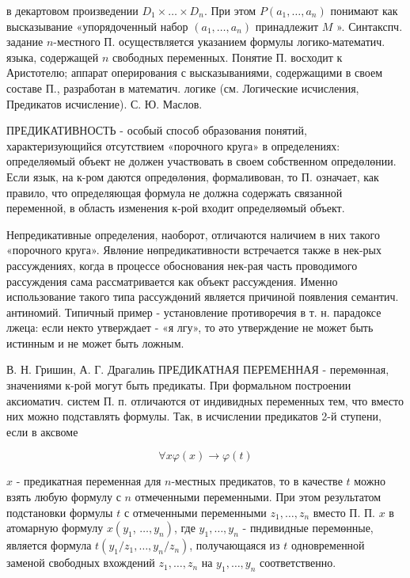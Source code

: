 \documentclass[10pt]{article}
\begin{document}
в декартовом произведении $D_{1} \times \ldots \times D_{n}$. При этом $P\left(a_{1}, \ldots, a_{n}\right)$ понимают как высказывание «упорядоченный набор $\left(a_{1}, \ldots, a_{n}\right)$ принадлежит $M$ ». Синтакспч. задание $n$-местного П. осуществляется указанием формулы логико-математич. языка, содержащей $n$ свободных переменных. Понятие П. восходит к Аристотелю; аппарат оперирования с высказываниями, содержащими в своем составе П., разработан в математич. логике (см. Логические исчисления, Предикатов исчисление). С. Ю. Маслов.



ПРЕДИКАТИВНОСТЬ - особый способ образования понятий, характеризующийся отсутствием «порочного круга» в определениях: определяөмый объект не должен участвовать в своем собственном опредөлөнии. Если язык, на к-ром даются опредөлөния, формаливован, то П. означает, как правило, что определяющая формула не должна содержать связанной переменной, в область изменения к-рой входит определяөмый объект.



Непредикативные определения, наоборот, отличаются наличием в них такого «порочного круга». Явлөние нөпредикативности встречается также в нек-рых рассуждениях, когда в процессе обоснования нек-рая часть проводимого рассуждения сама рассматривается как объект рассуждения. Именно использование такого типа рассуждөний является причиной появления семантич. антиномий. Типичный пример - установление противоречия в т. н. парадоксе лжеца: если некто утверждает - «я лгу», то әто утверждение не может быть истинным и не может быть ложным.



В. Н. Гришин, А. Г. Драгалињ ПРЕДИКАТНАЯ ПЕРЕМЕННАЯ - перемөнная, значениями к-рой могут быть предикаты. При формальном построении аксиоматич. систем П. п. отличаются от индивидных переменных тем, что вместо них можно подставлять формулы. Так, в исчислении предикатов 2-й ступени, если в аксвоме



\[

\forall x \varphi(x) \longrightarrow \varphi(t)

\]



$x$ - предикатная переменная для $n$-местных предикатов, то в качестве $t$ можно взять любую формулу с $n$ отмеченными переменными. При этом результатом подстановки формулы $t$ с отмеченными переменными $z_{1}, \ldots, z_{n}$ вместо П. П. $x$ в атомарную формулу $x\left(y_{1}\right.$, $\left.\ldots, y_{n}\right)$, где $y_{1}, \ldots, y_{n}$ - пндивидные перемөнные, является формула $t\left(y_{1} / z_{1}, \ldots, y_{n} / z_{n}\right)$, получающаяся из $t$ одновременной заменой свободных вхождений $z_{1}, \ldots, z_{n}$ на $y_{1}, \ldots, y_{n}$ соответственно.
\end{document}
